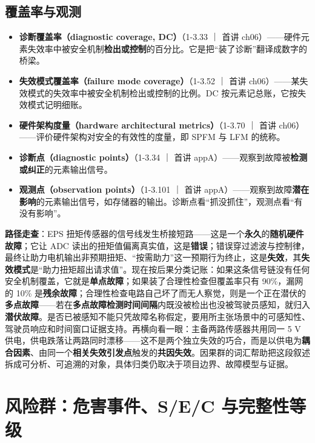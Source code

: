 \subsection{覆盖率与观测}

\begin{itemize}
\item \textbf{诊断覆盖率（diagnostic coverage, DC）}（1-3.33 ｜ 首讲 ch06）——硬件元素失效率中被安全机制\textbf{检出或控制}的百分比。它是把“装了诊断”翻译成数字的桥梁。
\item \textbf{失效模式覆盖率（failure mode coverage）}（1-3.52 ｜ 首讲 ch06）——某失效模式的失效率中被安全机制检出或控制的比例。DC 按元素记总账，它按失效模式记明细账。
\item \textbf{硬件架构度量（hardware architectural metrics）}（1-3.70 ｜ 首讲 ch06）——评价硬件架构对安全的有效性的度量，即 SPFM 与 LFM 的统称。
\item \textbf{诊断点（diagnostic points）}（1-3.34 ｜ 首讲 appA）——观察到故障被\textbf{检测或纠正}的元素输出信号。
\item \textbf{观测点（observation points）}（1-3.101 ｜ 首讲 appA）——观察到故障\textbf{潜在影响}的元素输出信号，如存储器的输出。诊断点看“抓没抓住”，观测点看“有没有影响”。
\end{itemize}

\textbf{路径走查}：EPS 扭矩传感器的信号线发生桥接短路——这是一个\textbf{永久}的\textbf{随机硬件故障}；它让 ADC 读出的扭矩值偏离真实值，这是\textbf{错误}；错误穿过滤波与控制律，最终让助力电机输出非预期扭矩、“按需助力”这一预期行为终止，这是\textbf{失效}，其\textbf{失效模式}是“助力扭矩超出请求值”。现在按后果分类记账：如果这条信号链没有任何安全机制覆盖，它就是\textbf{单点故障}；如果装了合理性检查但覆盖率只有 90\%，漏网的 10\% 是\textbf{残余故障}；合理性检查电路自己坏了而无人察觉，则是一个正在潜伏的\textbf{多点故障}——若在\textbf{多点故障检测时间间隔}内既没被检出也没被驾驶员感知，就归入\textbf{潜伏故障}。是否已被感知不能只凭故障名称假定，要用所主张场景中的可感知性、驾驶员响应和时间窗口证据支持。再横向看一眼：主备两路传感器共用同一 5 V 供电，供电跌落让两路同时漂移——这不是两个独立失效的巧合，而是以供电为\textbf{耦合因素}、由同一个\textbf{相关失效引发点}触发的\textbf{共因失效}。因果群的词汇帮助把这段叙述拆成可分析、可追溯的对象，具体归类仍取决于项目边界、故障模型与证据。


\section{风险群：危害事件、S/E/C 与完整性等级}

